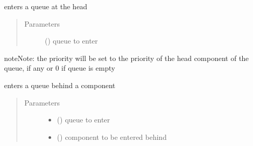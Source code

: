 \documentclass[letterpaper,10pt,english]{sphinxmanual}
\begin{document}
\begin{fulllineitems}
\begin{fulllineitems}
\end{fulllineitems}


\begin{fulllineitems}
\label{\detokenize{Reference:salabim.Component.enter_at_head}}
enters a queue at the head
\begin{quote}\begin{description}
\item[{Parameters}] \leavevmode
{} ({\hyperref[\detokenize{Reference:salabim.Queue}]{}}) \textendash{} queue to enter

\end{description}\end{quote}

\begin{sphinxadmonition}{note}{Note:}
the priority will be set to
the priority of the head component of the queue, if any
or 0 if queue is empty
\end{sphinxadmonition}

\end{fulllineitems}


\begin{fulllineitems}
\label{\detokenize{Reference:salabim.Component.enter_behind}}
enters a queue behind a component
\begin{quote}\begin{description}
\item[{Parameters}] \leavevmode\begin{itemize}
\item {} 
 ({\hyperref[\detokenize{Reference:salabim.Queue}]{}}) \textendash{} queue to enter

\item {} 
 ({\hyperref[\detokenize{Reference:salabim.Component}]{}}) \textendash{} component to be entered behind

\end{itemize}

\end{description}\end{quote}


\end{fulllineitems}
\end{fulllineitems}
\end{document}
